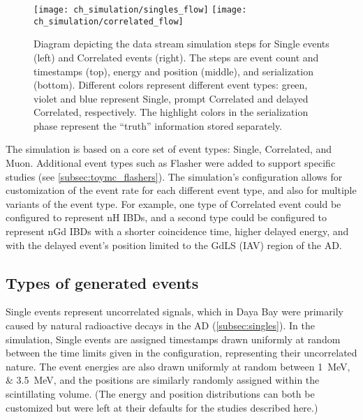 \begin{figure}
    \centering
    \texttt{[image: ch\_simulation/singles\_flow]}
    \texttt{[image: ch\_simulation/correlated\_flow]}
    \caption[Data stream simulation diagram]{
        Diagram depicting the data stream simulation steps
        for Single events (left) and Correlated events (right).
        The steps are event count and timestamps (top),
        energy and position (middle), and serialization (bottom).
        Different colors represent different event types:
        green, violet and blue represent Single,
        prompt Correlated and delayed Correlated,
        respectively.
        The highlight colors in the serialization phase
        represent the ``truth'' information stored separately.
    }
    \label{fig:my_toymc_flowchart}
\end{figure}


The simulation is based on a core set of event types:
Single, Correlated, and Muon.
Additional event types such as Flasher were added to support specific studies
(see \cref{subsec:toymc_flashers}).
The simulation's configuration allows for customization of the event rate
for each different event type,
and also for multiple variants of the event type.
For example, one type of Correlated event could be configured to represent nH IBDs,
and a second type could be configured to represent nGd IBDs
with a shorter coincidence time, higher delayed energy,
and with the delayed event's position limited to the GdLS (IAV) region of the AD.

\subsection{Types of generated events}

Single events represent uncorrelated signals,
which in Daya Bay were primarily caused by natural radioactive decays in the AD
(\cref{subsec:singles}).
In the simulation, Single events are assigned timestamps
drawn uniformly at random between the time limits given in the configuration,
representing their uncorrelated nature.
The event energies are also drawn uniformly at random
between \SIlist{1;3.5}{\MeV},
and the positions are similarly randomly assigned
within the scintillating volume.
(The energy and position distributions can both be customized
but were left at their defaults for the studies described here.)


